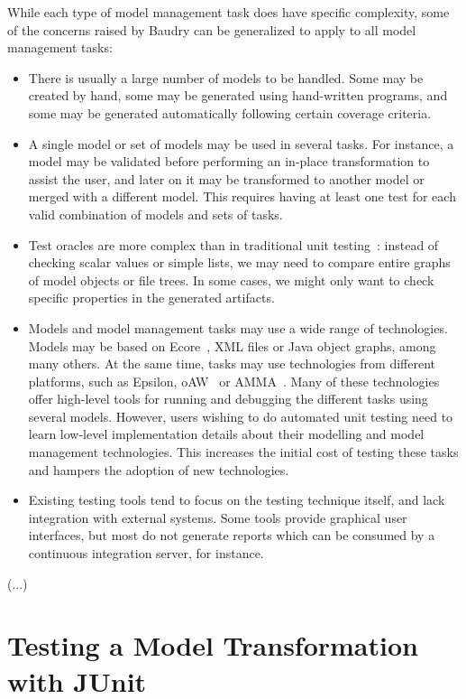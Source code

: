 While each type of model management task does have specific complexity, some of the concerns raised by Baudry can be generalized to apply to all model management tasks:
\begin{itemize}
\item There is usually a large number of models to be handled. Some may be created by hand, some may be generated using hand-written programs, and some may be generated automatically following certain coverage criteria.

\item A single model or set of models may be used in several tasks. For instance, a model may be validated before performing an in-place transformation to assist the user, and later on it may be transformed to another model or merged with a different model. This requires having at least one test for each valid combination of models and sets of tasks.

\item Test oracles are more complex than in traditional unit testing~\cite{Mottu2008}: instead of checking scalar values or simple lists, we may need to compare entire graphs of model objects or file trees. In some cases, we might only want to check specific properties in the generated artifacts.

\item Models and model management tasks may use a wide range of technologies. Models may be based on Ecore~\cite{Steinberg2008}, XML files or Java object graphs, among many others. At the same time, tasks may use technologies from different platforms, such as Epsilon, oAW~\cite{oAW} or AMMA~\cite{AMMA}. Many of these technologies offer high-level tools for running and debugging the different tasks using several models. However, users wishing to do automated unit testing need to learn low-level implementation details about their modelling and model management technologies. This increases the initial cost of testing these tasks and hampers the adoption of new technologies.

\item Existing testing tools tend to focus on the testing technique itself, and lack integration with external systems. Some tools provide graphical user interfaces, but most do not generate reports which can be consumed by a continuous integration server, for instance.
\end{itemize}

(...)

\section{Testing a Model Transformation with JUnit}
\label{sec:eunit-motiv-test-model}

